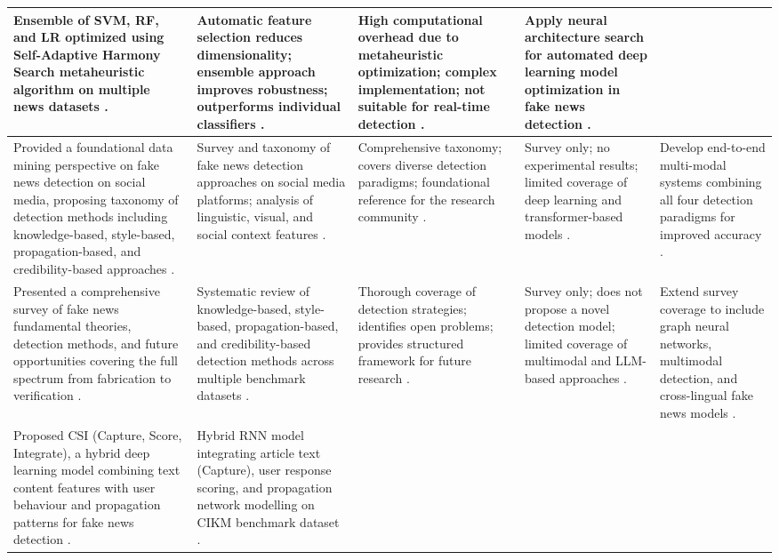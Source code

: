 \begin{longtable}{|p{}|p{}|p{}|p{}|p{}|}
Ensemble of SVM, RF, and LR optimized using Self-Adaptive Harmony Search metaheuristic algorithm on multiple news datasets \cite{Huang2020FakeNews}. &
Automatic feature selection reduces dimensionality; ensemble approach improves robustness; outperforms individual classifiers \cite{Huang2020FakeNews}. &
High computational overhead due to metaheuristic optimization; complex implementation; not suitable for real-time detection \cite{Huang2020FakeNews}. &
Apply neural architecture search for automated deep learning model optimization in fake news detection \cite{Huang2020FakeNews}. \\ \hline
Provided a foundational data mining perspective on fake news detection on social media, proposing taxonomy of detection methods including knowledge-based, style-based, propagation-based, and credibility-based approaches \cite{Shu2017FakeNewsDetection}. &
Survey and taxonomy of fake news detection approaches on social media platforms; analysis of linguistic, visual, and social context features \cite{Shu2017FakeNewsDetection}. &
Comprehensive taxonomy; covers diverse detection paradigms; foundational reference for the research community \cite{Shu2017FakeNewsDetection}. &
Survey only; no experimental results; limited coverage of deep learning and transformer-based models \cite{Shu2017FakeNewsDetection}. &
Develop end-to-end multi-modal systems combining all four detection paradigms for improved accuracy \cite{Shu2017FakeNewsDetection}. \\ \hline
Presented a comprehensive survey of fake news fundamental theories, detection methods, and future opportunities covering the full spectrum from fabrication to verification \cite{Zhou2020Survey}. &
Systematic review of knowledge-based, style-based, propagation-based, and credibility-based detection methods across multiple benchmark datasets \cite{Zhou2020Survey}. &
Thorough coverage of detection strategies; identifies open problems; provides structured framework for future research \cite{Zhou2020Survey}. &
Survey only; does not propose a novel detection model; limited coverage of multimodal and LLM-based approaches \cite{Zhou2020Survey}. &
Extend survey coverage to include graph neural networks, multimodal detection, and cross-lingual fake news models \cite{Zhou2020Survey}. \\ \hline
Proposed CSI (Capture, Score, Integrate), a hybrid deep learning model combining text content features with user behaviour and propagation patterns for fake news detection \cite{Ruchansky2017CSI}. &
Hybrid RNN model integrating article text (Capture), user response scoring, and propagation network modelling on CIKM benchmark dataset \cite{Ruchansky2017CSI}. &

\end{longtable}
